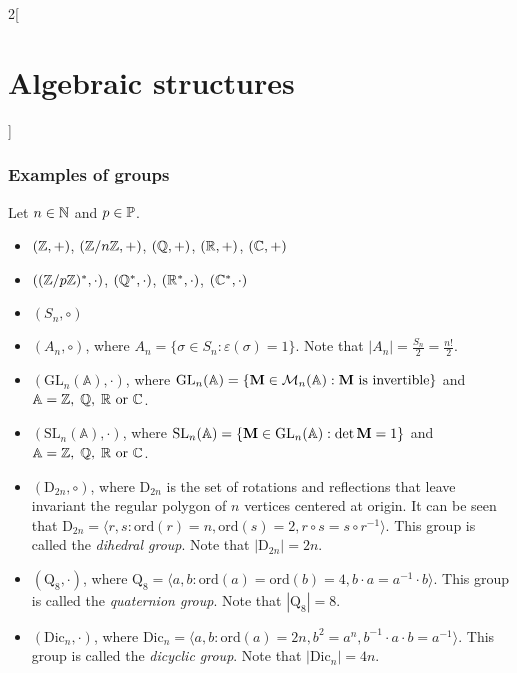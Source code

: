 \documentclass[../../../main.tex]{subfiles}
\begin{document}
\begin{multicols}{2}[\section{Algebraic structures}]
    \subsubsection*{Examples of groups}\label{AS-examples}
    Let $n\in\mathbb{N}$ and $p\in\mathbb{P}$.
    \begin{itemize}
        \item $(\mathbb{Z},+)$, $(\mathbb{Z}/n\mathbb{Z},+)$, $(\mathbb{Q},+)$, $(\mathbb{R},+)$, $(\mathbb{C},+)$
        \item $((\mathbb{Z}/p\mathbb{Z})^*,\cdot)$, $(\mathbb{Q}^*,\cdot)$, $(\mathbb{R}^*,\cdot)$, $(\mathbb{C}^*,\cdot)$
        \item $(S_n,\circ)$
        \item $(A_n,\circ)$, where $A_n=\{\sigma\in S_n:\varepsilon(\sigma)=1\}$. Note that $|A_n|=\frac{S_n}{2}=\frac{n!}{2}$.
        \item $(\text{GL}_n(\mathbb{A}),\cdot)$, where $\text{GL}_n(\mathbb{A})=\{\boldsymbol{\mathrm{M}}\in\mathcal{M}_n(\mathbb{A}):\boldsymbol{\mathrm{M}}\text{ is invertible}\}$ and $\mathbb{A}=\mathbb{Z},\;\mathbb{Q},\;\mathbb{R}\text{ or }\mathbb{C}$.
        \item $(\text{SL}_n(\mathbb{A}),\cdot)$, where $\text{SL}_n(\mathbb{A})=\{\boldsymbol{\mathrm{M}}\in\text{GL}_n(\mathbb{A}):\det\boldsymbol{\mathrm{M}}=1\}$ and $\mathbb{A}=\mathbb{Z},\;\mathbb{Q},\;\mathbb{R}\text{ or }\mathbb{C}$.
        \item $(\text{D}_{2n},\circ)$, where $\text{D}_{2n}$ is the set of rotations and reflections that leave invariant the regular polygon of $n$ vertices centered at origin. It can be seen that $\text{D}_{2n}=\langle r,s:\text{ord}(r)=n,\text{ord}(s)=2,r\circ s=s\circ r^{-1}\rangle$. This group is called the \textit{dihedral group}. Note that $|\text{D}_{2n}|=2n$.
        \item $(\text{Q}_8,\cdot)$, where $\text{Q}_8=\langle a,b:\text{ord}(a)=\text{ord}(b)=4,b\cdot a=a^{-1}\cdot b\rangle$. This group is called the \textit{quaternion group}. Note that $|\text{Q}_8|=8$.
        \item $(\text{Dic}_n,\cdot)$, where $\text{Dic}_n=\langle a,b:\text{ord}(a)=2n,b^2=a^n,b^{-1}\cdot a\cdot b=a^{-1}\rangle$. This group is called the \textit{dicyclic group}. Note that $|\text{Dic}_n|=4n$.
    \end{itemize}

\end{multicols}
\end{document}
